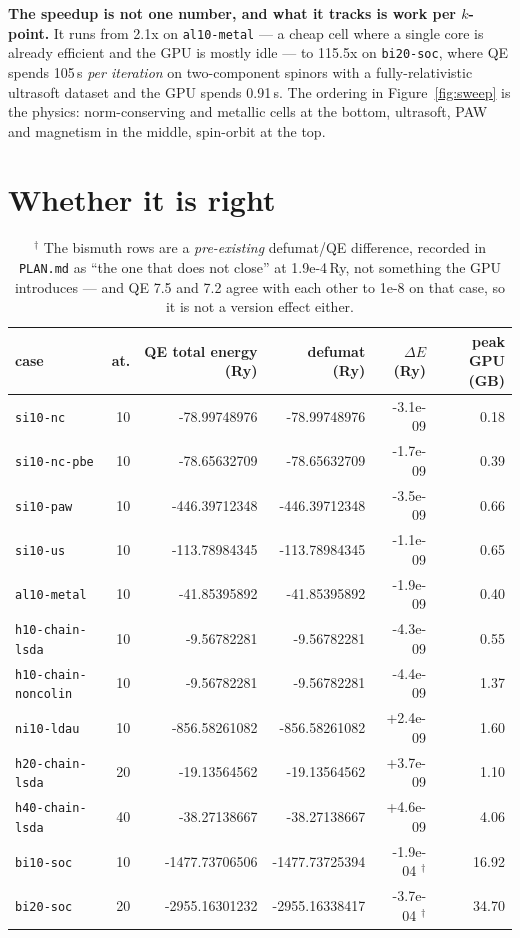 \documentclass[11pt,a4paper]{article}
\begin{document}
\textbf{The speedup is not one number, and what it tracks is work per $k$-point.}
It runs from 2.1x on \texttt{al10-metal} --- a cheap cell where a single core is
already efficient and the GPU is mostly idle --- to 115.5x on \texttt{bi20-soc},
where QE spends 105\,s \emph{per iteration} on two-component spinors with a
fully-relativistic ultrasoft dataset and the GPU spends 0.91\,s. The
ordering in Figure~\ref{fig:sweep} is the physics: norm-conserving and metallic
cells at the bottom, ultrasoft, PAW and magnetism in the middle, spin-orbit at
the top.

\section*{Whether it is right}

\begin{table}[htbp]
\centering
\small
\begin{tabular}{lrrrrr}
\toprule
case & at. & QE total energy (Ry) & defumat (Ry) & $\Delta E$ (Ry) & peak GPU (GB) \\
\midrule
\texttt{si10-nc} & 10 & -78.99748976 & -78.99748976 & -3.1e-09 & 0.18 \\
\texttt{si10-nc-pbe} & 10 & -78.65632709 & -78.65632709 & -1.7e-09 & 0.39 \\
\texttt{si10-paw} & 10 & -446.39712348 & -446.39712348 & -3.5e-09 & 0.66 \\
\texttt{si10-us} & 10 & -113.78984345 & -113.78984345 & -1.1e-09 & 0.65 \\
\texttt{al10-metal} & 10 & -41.85395892 & -41.85395892 & -1.9e-09 & 0.40 \\
\texttt{h10-chain-lsda} & 10 & -9.56782281 & -9.56782281 & -4.3e-09 & 0.55 \\
\texttt{h10-chain-noncolin} & 10 & -9.56782281 & -9.56782281 & -4.4e-09 & 1.37 \\
\texttt{ni10-ldau} & 10 & -856.58261082 & -856.58261082 & +2.4e-09 & 1.60 \\
\texttt{h20-chain-lsda} & 20 & -19.13564562 & -19.13564562 & +3.7e-09 & 1.10 \\
\texttt{h40-chain-lsda} & 40 & -38.27138667 & -38.27138667 & +4.6e-09 & 4.06 \\
\texttt{bi10-soc} & 10 & -1477.73706506 & -1477.73725394 & -1.9e-04 $^\dagger$ & 16.92 \\
\texttt{bi20-soc} & 20 & -2955.16301232 & -2955.16338417 & -3.7e-04 $^\dagger$ & 34.70 \\
\bottomrule
\end{tabular}
\caption{$^\dagger$ The bismuth rows are a \emph{pre-existing} defumat/QE
difference, recorded in \texttt{PLAN.md} as ``the one that does not close'' at
1.9e-4\,Ry, not something the GPU introduces --- and QE 7.5 and 7.2 agree with
each other to 1e-8 on that case, so it is not a version effect either.}
\label{tab:energy}
\end{table}
\end{document}
